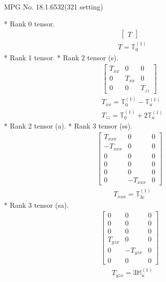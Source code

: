 \documentclass[fleqn,8pt,landscape]{jsarticle}
\begin{document}
\setcounter{MaxMatrixCols}{32}

\renewcommand{\tablename}{Table~}
\renewcommand{\figurename}{Figure~}
\begin{center}
\LARGE
MPG No. 18.1.65\quad$32$\quad(321 setting)
\end{center}
* Rank 0 tensor.
\begin{align*}
\begin{bmatrix} T \end{bmatrix}
\end{align*}
\begin{align*}
& T = \mathbb{T}_{0}^{(1)}
\end{align*}
* Rank 1 tensor.
* Rank 2 tensor (s).
\begin{align*}
\begin{bmatrix} T_{xx} & 0 & 0 \\ 0 & T_{xx} & 0 \\ 0 & 0 & T_{zz} \end{bmatrix}
\end{align*}
\begin{align*}
& T_{xx} = \mathbb{T}_{0}^{(1)} - \mathbb{T}_{u}^{(1)} \\
& T_{zz} = \mathbb{T}_{0}^{(1)} + 2 \mathbb{T}_{u}^{(1)}
\end{align*}
* Rank 2 tensor (a).
* Rank 3 tensor (ss).
\begin{align*}
\begin{bmatrix} T_{xxx} & 0 & 0 \\ - T_{xxx} & 0 & 0 \\ 0 & 0 & 0 \\ 0 & 0 & 0 \\ 0 & 0 & 0 \\ 0 & - T_{xxx} & 0 \end{bmatrix}
\end{align*}
\begin{align*}
& T_{xxx} = \mathbb{T}_{3c}^{(1)}
\end{align*}
* Rank 3 tensor (sa).
\begin{align*}
\begin{bmatrix} 0 & 0 & 0 \\ 0 & 0 & 0 \\ 0 & 0 & 0 \\ T_{yzx} & 0 & 0 \\ 0 & - T_{yzx} & 0 \\ 0 & 0 & 0 \end{bmatrix}
\end{align*}
\begin{align*}
& T_{yzx} = 3 \mathbb{M}_{u}^{(1)}
\end{align*}
\end{document}
